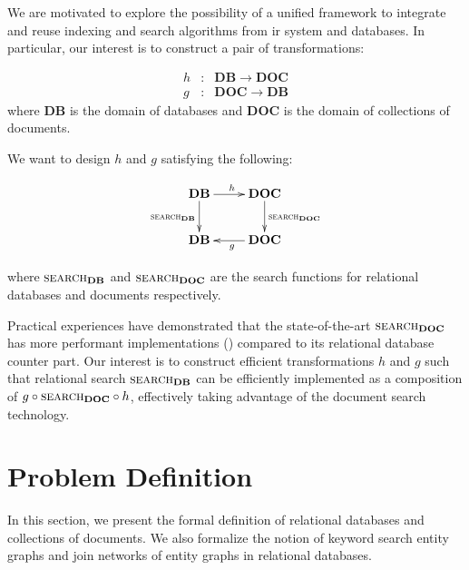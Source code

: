 \documentclass[conference]{IEEEtran}
\newcommand{\op}[1]{{\textsc{#1}}}
\newcommand{\DB}{\mathbf{DB}}
\newcommand{\DOC}{\mathbf{DOC}}
\begin{document}
We are motivated to explore the possibility of a unified framework to integrate and reuse indexing and search algorithms from \gls{ir} system and databases.  In particular, our interest is to construct a pair of transformations:

\begin{eqnarray*}
h &:& \mathbf{DB} \to \mathbf{DOC} \\
g &:& \mathbf{DOC} \to \mathbf{DB}
\end{eqnarray*}
where $\mathbf{DB}$ is the domain of databases and $\mathbf{DOC}$ is the domain of collections of documents.

We want to design $h$ and $g$ satisfying the following:

\begin{displaymath}
\xymatrix {
    \mathbf{DB} \ar[r]^h\ar[d]_{\op{search}_\mathbf{DB}} 
        & \mathbf{DOC}\ar[d]^{\op{search}_\mathbf{DOC}} \\
    \mathbf{DB} & \mathbf{DOC}\ar[l]^g
}
\end{displaymath}

where $\op{search}_\DB$ and $\op{search}_\DOC$ are the search functions for relational databases and documents respectively.

Practical experiences have demonstrated that the state-of-the-art $\op{search}_\DOC$ has more performant implementations (\cite{xapian,lucene}) compared to its relational database counter part.  Our interest is to construct efficient transformations $h$ and $g$ such that relational search $\op{search}_\DB$ can be efficiently implemented as a composition of $g\circ \op{search}_\DOC\circ h$, effectively taking advantage of the document search technology.

\section{Problem Definition}

In this section, we present the formal definition of relational databases and collections of documents.  We also formalize the notion of keyword search entity graphs and join networks of entity graphs in relational databases.



\end{document}
